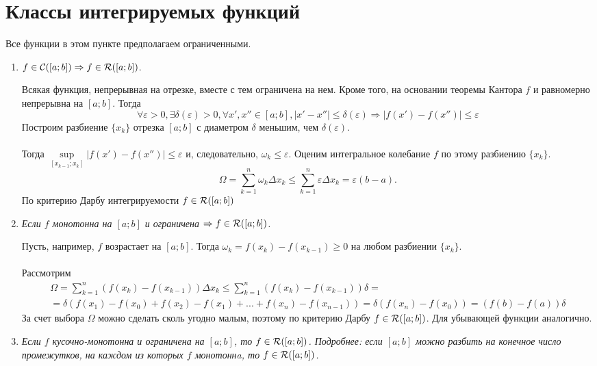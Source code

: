 \section{Классы интегрируемых функций}
Все функции в этом пункте предполагаем ограниченными.
\begin{enumerate}
	\item 
	$f \in \mathcal{C}([a;b]) \Rightarrow f \in\mathcal{R}([a; b])$.
	\begin{Proof}
		Всякая функция, непрерывная на отрезке, вместе с тем ограничена на нем. Кроме того, на основании теоремы Кантора $f$ и равномерно непрерывна на $[a;b]$. Тогда $$\forall \varepsilon > 0, \exists \delta(\varepsilon) > 0, \forall x', x'' \in [a;b], |x'-x''| \leqslant \delta(\varepsilon) \Rightarrow |f(x') - f(x'')|\leqslant \varepsilon$$
		Построим разбиение $\{x_k\}$ отрезка $[a;b]$ с диаметром $\delta$ меньшим, чем $\delta(\varepsilon)$.\\\\ Тогда $\sup\limits_{[x_{k - 1};x_k]} |f(x')-f(x'')| \leqslant \varepsilon$ и, следовательно, $\omega_k \leqslant \varepsilon$. Оценим интегральное колебание $f$ по этому разбиению $\{x_k\}$.
		$$\displaystyle\Omega = \sum\limits_{k = 1}^{n} \omega_k \Delta x_k \leqslant  \sum\limits_{k = 1}^{n} \varepsilon\Delta x_k = \varepsilon(b - a).$$
		По критерию Дарбу интегрируемости $f \in\mathcal{R}([a; b])$
	\end{Proof}
	\item \textit{Если $f$ монотонна на $[a;b]$ и ограничена $\Rightarrow f \in\mathcal{R}([a; b])$.}
	\begin{Proof}
		Пусть, например, $f$ возрастает на $[a;b]$. Тогда $\omega_k = f(x_k) - f(x_{k - 1}) \geqslant 0$  на любом разбиении $\{x_k\}$.\\\\
		Рассмотрим 
		\begin{multline*}
			\displaystyle\Omega = \sum\limits_{k=1}^{n}(f(x_k)- f(x_{k - 1}))\Delta x_k \leqslant \sum\limits_{k=1}^{n}(f(x_k)- f(x_{k - 1}))\delta = \\  = \delta(f(x_1) - f(x_0) + f(x_2) - f(x_1) + ... + f(x_n) - f(x_{n - 1})) = \delta (f(x_n) - f(x_0)) = (f(b) - f(a))\delta
		\end{multline*}
		За счет выбора $\Omega$ можно сделать сколь угодно малым, поэтому по критерию Дарбу $f \in\mathcal{R}([a; b])$. Для убывающей функции аналогично.
	\end{Proof}
	\item \textit{Если $f$ кусочно-монотонна и ограничена на $[a;b]$, то $f \in\mathcal{R}([a; b])$. Подробнее: если $[a;b]$ можно разбить на конечное число промежутков, на каждом из которых $f$ монотоннa, то $f \in\mathcal{R}([a; b])$.}

\end{enumerate}
